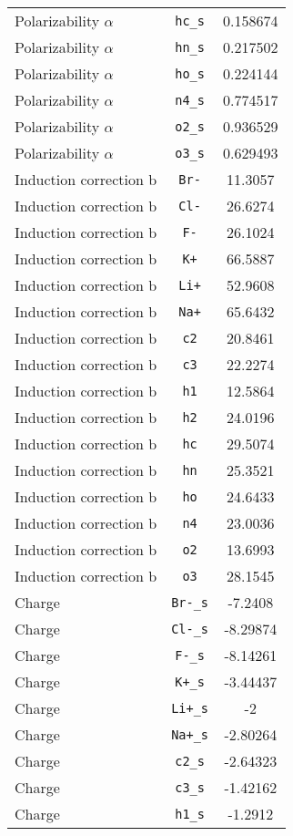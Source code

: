 \begin{table}[ht]
\begin{tabular}{lcc}
Polarizability $\alpha$ & \verb^hc_s^ & 0.158674 \\ 
Polarizability $\alpha$ & \verb^hn_s^ & 0.217502 \\ 
Polarizability $\alpha$ & \verb^ho_s^ & 0.224144 \\ 
Polarizability $\alpha$ & \verb^n4_s^ & 0.774517 \\ 
Polarizability $\alpha$ & \verb^o2_s^ & 0.936529 \\ 
Polarizability $\alpha$ & \verb^o3_s^ & 0.629493 \\ 
Induction correction b & \verb^Br-^ & 11.3057 \\ 
Induction correction b & \verb^Cl-^ & 26.6274 \\ 
Induction correction b & \verb^F-^ & 26.1024 \\ 
Induction correction b & \verb^K+^ & 66.5887 \\ 
Induction correction b & \verb^Li+^ & 52.9608 \\ 
Induction correction b & \verb^Na+^ & 65.6432 \\ 
Induction correction b & \verb^c2^ & 20.8461 \\ 
Induction correction b & \verb^c3^ & 22.2274 \\ 
Induction correction b & \verb^h1^ & 12.5864 \\ 
Induction correction b & \verb^h2^ & 24.0196 \\ 
Induction correction b & \verb^hc^ & 29.5074 \\ 
Induction correction b & \verb^hn^ & 25.3521 \\ 
Induction correction b & \verb^ho^ & 24.6433 \\ 
Induction correction b & \verb^n4^ & 23.0036 \\ 
Induction correction b & \verb^o2^ & 13.6993 \\ 
Induction correction b & \verb^o3^ & 28.1545 \\ 
Charge & \verb^Br-_s^ & -7.2408 \\ 
Charge & \verb^Cl-_s^ & -8.29874 \\ 
Charge & \verb^F-_s^ & -8.14261 \\ 
Charge & \verb^K+_s^ & -3.44437 \\ 
Charge & \verb^Li+_s^ & -2 \\ 
Charge & \verb^Na+_s^ & -2.80264 \\ 
Charge & \verb^c2_s^ & -2.64323 \\ 
Charge & \verb^c3_s^ & -1.42162 \\ 
Charge & \verb^h1_s^ & -1.2912 \\ 

\end{tabular}
\end{table}
